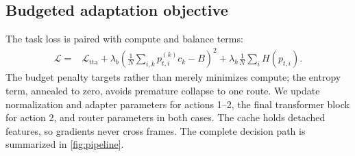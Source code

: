 \subsection{Budgeted adaptation objective}

The task loss is paired with compute and balance terms:
\begin{align}
 \mathcal{L}={}&\mathcal{L}_{\mathrm{tta}}
 +\lambda_b\left(\frac{1}{N}\sum_{i,k}p_{t,i}^{(k)}c_k-B\right)^2
 +\lambda_h\frac{1}{N}\sum_i H(p_{t,i}).
 \label{eq:objective}
\end{align}
The budget penalty targets rather than merely minimizes compute; the entropy
term, annealed to zero, avoids premature collapse to one route.  We update
normalization and adapter parameters for actions 1--2, the final transformer
block for action 2, and router parameters in both cases.  The cache holds
detached features, so gradients never cross frames.  The complete decision
path is summarized in \cref{fig:pipeline}.

